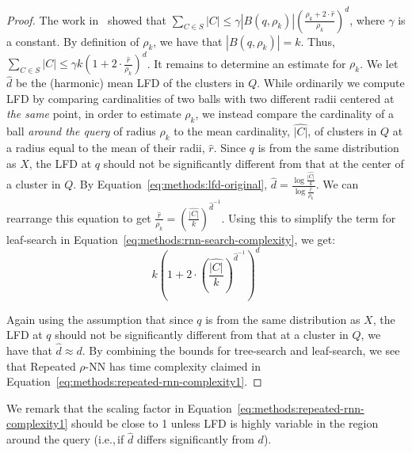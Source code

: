 \begin{proof}
The work in~\cite{yu2015entropy} showed that $\sum_{C \in S} |C| \leq \gamma  \left| B(q, \rho_k) \right| \left(\frac{\rho_k + 2 \cdot \hat{r}}{\rho_k} \right)^d$, where $\gamma$ is a constant.
By definition of $\rho_k$, we have that $|B(q, \rho_k)| = k$.
Thus, $\sum_{C \in S} |C| \leq \gamma k \left( 1 + 2 \cdot \frac{\hat{r}}{\rho_k} \right)^d$.
It remains to determine an estimate for $\rho_k$.
We let $\hat{d}$ be the (harmonic) mean LFD of the clusters in $Q$.
While ordinarily we compute LFD by comparing cardinalities of two balls with two different radii centered at \textit{the same} point, in order to estimate $\rho_k$, we instead compare the cardinality of a ball \textit{around the query} of radius $\rho_k$ to the mean cardinality, $\hat{|C|}$, of clusters in $Q$ at a radius equal to the mean of their radii, $\hat{r}$.
Since $q$ is from the same distribution as $X$, the LFD at $q$ should not be significantly different from that at the center of a cluster in $Q$.
By Equation~\ref{eq:methods:lfd-original}, $\hat{d} = \frac{\log{}\frac{\hat{|C|}}{k}}{\log{}\frac{\hat{r}}{\rho_k}}$.
We can rearrange this equation to get $\frac{\hat{r}}{\rho_k} = \left( \frac{\hat{|C|}}{k} \right)^{\hat{d}^{-1}}$.
Using this to simplify the term for leaf-search in Equation~\ref{eq:methods:rnn-search-complexity}, we get:
\begin{equation*}
    k \left( 1 + 2 \cdot \left( \frac{\hat{|C|}}{k} \right) ^ {\hat{d}^{-1}} \right)^d
\end{equation*}

Again using the assumption that since $q$ is from the same distribution as $X$, the LFD at $q$ should not be significantly different from that at a cluster in $Q$, we have that $\hat{d} \approx d$.
By combining the bounds for tree-search and leaf-search, we see that Repeated $\rho$-NN has time complexity claimed in Equation~\ref{eq:methods:repeated-rnn-complexity1}.
\end{proof}

We remark that the scaling factor in Equation~\ref{eq:methods:repeated-rnn-complexity1} should be close to 1 unless LFD is highly variable in the region around the query (i.e.,\,if $\hat{d}$ differs significantly from $d$).

